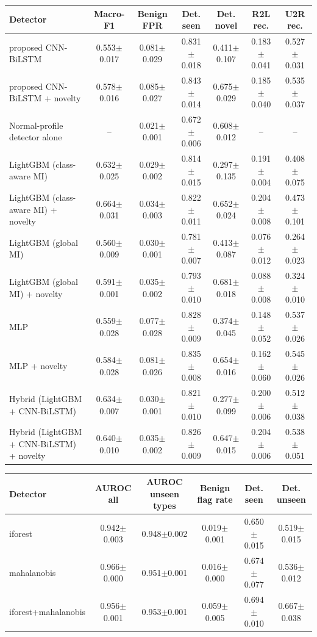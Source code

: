 \begin{tabular}{lcccccc}
\toprule
Detector & Macro-F1 & Benign FPR & Det. seen & Det. novel & R2L rec. & U2R rec. \\
\midrule
proposed CNN-BiLSTM & 0.553$\pm$0.017 & 0.081$\pm$0.029 & 0.831$\pm$0.018 & 0.411$\pm$0.107 & 0.183$\pm$0.041 & 0.527$\pm$0.031 \\
proposed CNN-BiLSTM + novelty & 0.578$\pm$0.016 & 0.085$\pm$0.027 & 0.843$\pm$0.014 & 0.675$\pm$0.029 & 0.185$\pm$0.040 & 0.535$\pm$0.037 \\
Normal-profile detector alone & -- & 0.021$\pm$0.001 & 0.672$\pm$0.006 & 0.608$\pm$0.012 & -- & -- \\
LightGBM (class-aware MI) & 0.632$\pm$0.025 & 0.029$\pm$0.002 & 0.814$\pm$0.015 & 0.297$\pm$0.135 & 0.191$\pm$0.004 & 0.408$\pm$0.075 \\
LightGBM (class-aware MI) + novelty & 0.664$\pm$0.031 & 0.034$\pm$0.003 & 0.822$\pm$0.011 & 0.652$\pm$0.024 & 0.204$\pm$0.008 & 0.473$\pm$0.101 \\
LightGBM (global MI) & 0.560$\pm$0.009 & 0.030$\pm$0.001 & 0.781$\pm$0.007 & 0.413$\pm$0.087 & 0.076$\pm$0.012 & 0.264$\pm$0.023 \\
LightGBM (global MI) + novelty & 0.591$\pm$0.001 & 0.035$\pm$0.002 & 0.793$\pm$0.010 & 0.681$\pm$0.018 & 0.088$\pm$0.008 & 0.324$\pm$0.010 \\
MLP & 0.559$\pm$0.028 & 0.077$\pm$0.028 & 0.828$\pm$0.009 & 0.374$\pm$0.045 & 0.148$\pm$0.052 & 0.537$\pm$0.026 \\
MLP + novelty & 0.584$\pm$0.028 & 0.081$\pm$0.026 & 0.835$\pm$0.008 & 0.654$\pm$0.016 & 0.162$\pm$0.060 & 0.545$\pm$0.026 \\
Hybrid (LightGBM + CNN-BiLSTM) & 0.634$\pm$0.007 & 0.030$\pm$0.001 & 0.821$\pm$0.010 & 0.277$\pm$0.099 & 0.200$\pm$0.006 & 0.512$\pm$0.038 \\
Hybrid (LightGBM + CNN-BiLSTM) + novelty & 0.640$\pm$0.010 & 0.035$\pm$0.002 & 0.826$\pm$0.009 & 0.647$\pm$0.015 & 0.204$\pm$0.006 & 0.538$\pm$0.051 \\
\bottomrule
\end{tabular}

\begin{tabular}{lccccc}
\toprule
Detector & AUROC all & AUROC unseen types & Benign flag rate & Det. seen & Det. unseen \\
\midrule
iforest & 0.942$\pm$0.003 & 0.948$\pm$0.002 & 0.019$\pm$0.001 & 0.650$\pm$0.015 & 0.519$\pm$0.015 \\
mahalanobis & 0.966$\pm$0.000 & 0.951$\pm$0.001 & 0.016$\pm$0.000 & 0.674$\pm$0.077 & 0.536$\pm$0.012 \\
iforest+mahalanobis & 0.956$\pm$0.001 & 0.953$\pm$0.001 & 0.059$\pm$0.005 & 0.694$\pm$0.010 & 0.667$\pm$0.038 \\
\bottomrule
\end{tabular}

